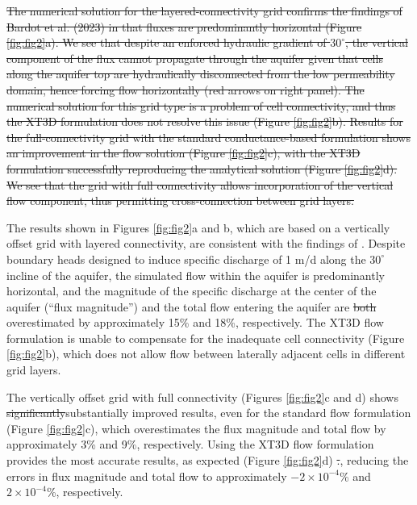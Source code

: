 \documentclass{article}
\begin{document}
{\color{red} \sout{The numerical solution for the layered-connectivity grid confirms the findings of Bardot et al. (2023) in that fluxes are predominantly horizontal (Figure \ref{fig:fig2}a). We see that despite an enforced hydraulic gradient of $30^{\circ}$, the vertical component of the flux cannot propagate through the aquifer given that cells along the aquifer top are hydraulically disconnected from the low permeability domain, hence forcing flow horizontally (red arrows on right panel). The numerical solution for this grid type is a problem of cell connectivity, and thus the XT3D formulation does not resolve this issue (Figure \ref{fig:fig2}b). Results for the full-connectivity grid with the standard conductance-based formulation shows an improvement in the flow solution (Figure \ref{fig:fig2}c), with the XT3D formulation successfully reproducing the analytical solution (Figure \ref{fig:fig2}d). We see that the grid with full connectivity allows incorporation of the vertical flow component, thus permitting cross-connection between grid layers.}}

The results shown in Figures \ref{fig:fig2}a and b, which are based on a vertically offset grid with layered connectivity, are consistent with the findings of \cite{bardot2023}. Despite boundary heads designed to induce specific discharge of 1 m/d along the $30^{\circ}$ incline of the aquifer, the simulated flow within the aquifer is predominantly horizontal, and the magnitude of the specific discharge at the center of the aquifer {\color{red} (``flux magnitude'')} and the total flow entering the aquifer are {\color{red} \sout{both}} overestimated {\color{red}by approximately 15\% and 18\%, respectively}. The XT3D flow formulation is unable to compensate for the inadequate cell connectivity (Figure \ref{fig:fig2}b), which does not allow flow between laterally adjacent cells in different grid layers.

The vertically offset grid with full connectivity (Figures \ref{fig:fig2}c and d) shows {\color{red} \sout{significantly}substantially} improved results, even for the standard flow formulation (Figure \ref{fig:fig2}c){\color{red}, which overestimates the flux magnitude and total flow by approximately 3\% and 9\%, respectively.} Using the XT3D flow formulation provides the most accurate results, as expected (Figure \ref{fig:fig2}d){\color{red} \sout{.}, reducing the errors in flux magnitude and total flow to approximately $-2 \times 10^{-4}$\% and $2 \times 10^{-4}$\%, respectively.}
\end{document}
